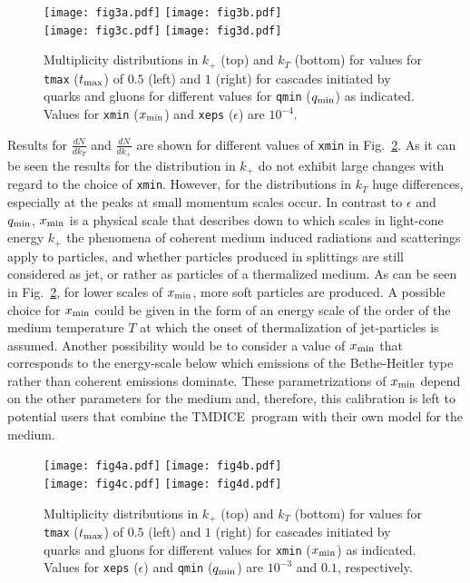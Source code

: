 \documentclass[preprint,12pt]{elsarticle}
\newcommand{\tmdice}{{\sf TMDICE}}
\begin{document}
\begin{figure}
\texttt{[image: fig3a.pdf]}
\texttt{[image: fig3b.pdf]}\\
\texttt{[image: fig3c.pdf]}
\texttt{[image: fig3d.pdf]}
\caption{Multiplicity distributions in $k_+$ (top) and $k_T$ (bottom) for values for \texttt{tmax} ($t_{\rm max}$) of $0.5$ (left) and $1$ (right) for cascades initiated by quarks and gluons for different values for \texttt{qmin} ($q_{\rm min}$) as indicated. Values for \texttt{xmin} ($x_{\rm min}$) and \texttt{xeps} ($\epsilon$) are $10^{-4}$.}
\label{fig3}
\end{figure}
Results for $\frac{dN}{dk_T}$ and $\frac{dN}{dk_+}$  are shown for different values of \texttt{xmin} in Fig.~\ref{fig4}. As it can be seen the results for the distribution in $k_+$ do not exhibit large changes with regard to the choice of \texttt{xmin}.
However, for the distributions in $k_T$ huge differences, especially at the peaks at small momentum scales occur.
In contrast to $\epsilon$ and $q_{\rm min}$, $x_{\rm min}$ is a physical scale that describes down to which scales in light-cone energy $k_+$ the phenomena of coherent medium induced radiations and scatterings apply to particles, and whether particles produced in splittings are still considered as jet, or rather as particles of a thermalized medium. 
As can be seen in Fig.~\ref{fig4}, for lower scales of $x_{\rm min}$, more soft particles are produced.
A possible choice for $x_{\rm min}$ could be given in the form of an energy scale of the order of the medium temperature $T$ at which the onset of thermalization of jet-particles is assumed. 
Another possibility would be to consider a value of $x_{\rm min}$ that corresponds to the energy-scale below which emissions of the Bethe-Heitler type rather than coherent emissions dominate.
These parametrizations of $x_{\rm min}$ depend on the other parameters for the medium and, therefore, this calibration is left to potential users that combine the \tmdice~program with their own model for the medium.
\begin{figure}
\texttt{[image: fig4a.pdf]}
\texttt{[image: fig4b.pdf]}\\
\texttt{[image: fig4c.pdf]}
\texttt{[image: fig4d.pdf]}
\caption{Multiplicity distributions in $k_+$ (top) and $k_T$ (bottom) for values for \texttt{tmax} ($t_{\rm max}$) of $0.5$ (left) and $1$ (right) for cascades initiated by quarks and gluons for different values for \texttt{xmin} ($x_{\rm min}$) as indicated. Values for \texttt{xeps} ($\epsilon$) and \texttt{qmin} ($q_{\rm min}$) are $10^{-3}$ and $0.1$, respectively.}
\label{fig4}
\end{figure}
\end{document}
